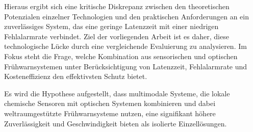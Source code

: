 Hieraus ergibt sich eine kritische Diskrepanz zwischen den theoretischen Potenzialen einzelner Technologien und den praktischen Anforderungen an ein zuverlässiges System, das eine geringe Latenzzeit mit einer niedrigen Fehlalarmrate verbindet. Ziel der vorliegenden Arbeit ist es daher, diese technologische Lücke durch eine vergleichende Evaluierung zu analysieren. Im Fokus steht die Frage, welche Kombination aus sensorischen und optischen Frühwarnsystemen unter Berücksichtigung von Latenzzeit, Fehlalarmrate und Kosteneffizienz den effektivsten Schutz bietet.

Es wird die Hypothese aufgestellt, dass multimodale Systeme, die lokale chemische Sensoren mit optischen Systemen kombinieren und dabei weltraumgestützte Frühwarnsysteme nutzen, eine signifikant höhere Zuverlässigkeit und Geschwindigkeit bieten als isolierte Einzellösungen.